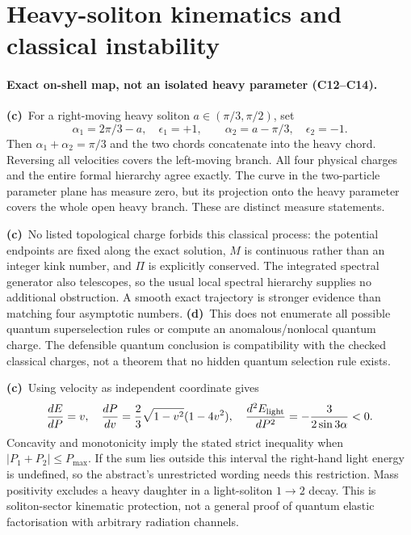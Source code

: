 \documentclass[11pt,a4paper]{article}
\newcommand{\Lc}{\textbf{(c)}\ }
\newcommand{\Ld}{\textbf{(d)}\ }
\begin{document}
\section{Heavy-soliton kinematics and classical instability}
\paragraph{Exact on-shell map, not an isolated heavy parameter (C12--C14).}
\Lc For a right-moving heavy soliton $a\in(\pi/3,\pi/2)$, set
\[
 \alpha_1=2\pi/3-a,\quad\epsilon_1=+1,\qquad
 \alpha_2=a-\pi/3,\quad\epsilon_2=-1.
\]
Then $\alpha_1+\alpha_2=\pi/3$ and the two chords concatenate into the heavy
chord. Reversing all velocities covers the left-moving branch. All four
physical charges and the entire formal hierarchy agree exactly. The curve in
the two-particle parameter plane has measure zero, but its projection onto
the heavy parameter covers the whole open heavy branch. These are distinct
measure statements.

\Lc No listed topological charge forbids this classical process: the potential
endpoints are fixed along the exact solution, $M$ is continuous rather than an
integer kink number, and $\Pi$ is explicitly conserved. The integrated spectral
generator also telescopes, so the usual local spectral hierarchy supplies no
additional obstruction. A smooth exact trajectory is stronger evidence than
matching four asymptotic numbers. \Ld This does not enumerate all possible
quantum superselection rules or compute an anomalous/nonlocal quantum charge.
The defensible quantum conclusion is compatibility with the checked classical
charges, not a theorem that no hidden quantum selection rule exists.

\Lc Using velocity as independent coordinate gives
\[
 \frac{dE}{dP}=v,\quad
 \frac{dP}{dv}=\frac23\sqrt{1-v^2}(1-4v^2),\quad
 \frac{d^2E_{\rm light}}{dP^2}=-\frac3{2\sin3\alpha}<0.
\]
Concavity and monotonicity imply the stated strict inequality when
$|P_1+P_2|\le P_{\max}$. If the sum lies outside this interval the right-hand
light energy is undefined, so the abstract's unrestricted wording needs this
restriction. Mass positivity excludes a heavy daughter in a light-soliton
$1\to2$ decay. This is soliton-sector kinematic protection, not a general
proof of quantum elastic factorisation with arbitrary radiation channels.
\end{document}
